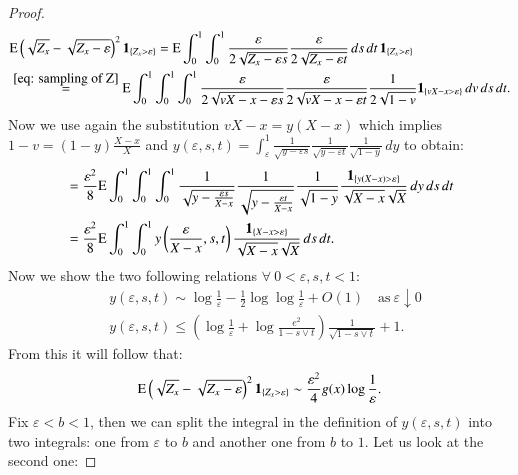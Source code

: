 \begin{proof}
\begin{align*}
    &\mathrm{E} \left( \sqrt{Z_x} - \sqrt{Z_x - \varepsilon} \right)^2 \mathbf{1}_{\{ Z_x > \varepsilon \}} =  \mathrm{E}  \int_{0}^{1} \int_{0}^{1} \frac{\varepsilon}{2 \sqrt{Z_x - \varepsilon s}} \frac{\varepsilon}{2 \sqrt{Z_x - \varepsilon t}} \, ds \, dt \, \mathbf{1}_{\{Z_x > \varepsilon \}} \\
    &\stackrel{\eqref{eq: sampling of Z}}{=} \mathrm{E}  \int_{0}^{1} \int_{0}^{1} \int_{0}^{1} \frac{\varepsilon}{2 \sqrt{vX-x - \varepsilon s}} \frac{\varepsilon}{2 \sqrt{v X - x - \varepsilon t}} \frac{1}{2 \sqrt{1-v}} \mathbf{1}_{\{vX - x > \varepsilon \}} \, dv \, ds \, dt.
\end{align*}
Now we use again the substitution $vX - x = y(X-x)$ which implies $1-v = (1-y) \frac{X-x}{X}$ and $y(\varepsilon,s,t) = \int_{\varepsilon}^{1} \frac{1}{\sqrt{y - \varepsilon s}} \frac{1}{\sqrt{y - \varepsilon t}} \frac{1}{\sqrt{1-y}} \, dy$ to obtain:
\begin{align*}
    &= \frac{\varepsilon^2}{8} \mathrm{E}  \int_{0}^{1} \int_{0}^{1} \int_{0}^{1} \frac{1}{\sqrt{y - \frac{\varepsilon s}{X-x}}} \frac{1}{\sqrt{y - \frac{\varepsilon t}{X-x}}} \frac{1}{ \sqrt{1-y}} \frac{\mathbf{1}_{\{y(X - x) > \varepsilon \}}}{\sqrt{X-x} \sqrt{X}} \, dy \, ds \, dt \\
    &= \frac{\varepsilon^2}{8} \mathrm{E}  \int_{0}^{1} \int_{0}^{1} y\left( \frac{\varepsilon}{X-x},s,t \right) \frac{\mathbf{1}_{\{X - x > \varepsilon \}}}{\sqrt{X-x} \sqrt{X}} \, ds \, dt.
\end{align*}
Now we show the two following relations $\forall \: 0 < \varepsilon,s,t < 1$:
\begin{align}
    &y(\varepsilon,s,t) \sim \log{\frac{1}{\varepsilon}} - \frac{1}{2}\log{\log{\frac{1}{\varepsilon}}} + O(1) \quad \text{as} \: \varepsilon \downarrow 0 \label{eq: relations on y} \\
    & y(\varepsilon,s,t) \leq \left( \log{\frac{1}{\varepsilon}} + \log{\frac{e^2}{1 - s \vee t}}\right) \frac{1}{\sqrt{1 - s \vee t}} + 1. \label{eq: relations on y 2}
\end{align}
From this it will follow that:
\begin{align}\label{eq: essential second moment rel variance}
    \mathrm{E} \left( \sqrt{Z_x} - \sqrt{Z_x - \varepsilon} \right)^2 \mathbf{1}_{\{ Z_x > \varepsilon \}} \sim \frac{\varepsilon^2}{4} g(x) \log{\frac{1}{\varepsilon}}. 
\end{align}
Fix $\varepsilon < b < 1$, then we can split the integral in the definition of $y(\varepsilon,s,t)$ into two integrals: one from $\varepsilon$ to $b$ and another one from $b$ to $1$. Let us look at the second one:

\end{proof}
